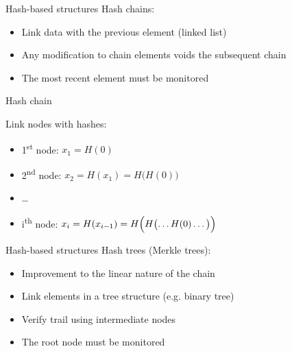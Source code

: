 \begin{frame}{Hash-based structures}
  Hash chains:
  \begin{itemize}[<+(1)->]
    \item Link data with the previous element (linked list)
    \item Any modification to chain elements voids the subsequent chain
    \item The most recent element must be monitored
  \end{itemize}
\end{frame}

\begin{frame}{Hash chain}
  \begin{center}
  \end{center}

  Link nodes with hashes:
  \begin{itemize}
    \item 1\textsuperscript{st} node: $x_1 = H(0)$
    \item 2\textsuperscript{nd} node: $x_2 = H(x_1) = H\bigl(H(0)\bigr)$
    \item \dots
    \item i\textsuperscript{th} node: $x_i = H(x_{i-1}) = H\Bigl(H\bigl(\dots H(0)\dots\bigr)\Bigr)$
  \end{itemize}
\end{frame}

\begin{frame}{Hash-based structures}
  Hash trees (Merkle trees):
  \begin{itemize}[<+(1)->]
    \item Improvement to the linear nature of the chain
    \item Link elements in a tree structure (e.g. binary tree)
    \item Verify trail using intermediate nodes
    \item The root node must be monitored
  \end{itemize}
\end{frame}

